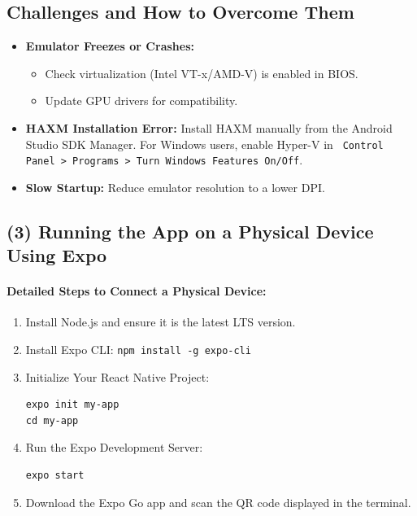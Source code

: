 \documentclass[12pt]{article}
\begin{document}
\subsection*{Challenges and How to Overcome Them}
\begin{itemize}
    \item \textbf{Emulator Freezes or Crashes:}
    \begin{itemize}
        \item Check virtualization (Intel VT-x/AMD-V) is enabled in BIOS.
        \item Update GPU drivers for compatibility.
    \end{itemize}
    \item \textbf{HAXM Installation Error:} Install HAXM manually from the Android Studio SDK Manager. For Windows users, enable Hyper-V in \texttt{ Control Panel > Programs > Turn Windows Features On/Off}.
    \item \textbf{Slow Startup:} Reduce emulator resolution to a lower DPI.
\end{itemize}

\subsection*{(3) Running the App on a Physical Device Using Expo}

\paragraph{Detailed Steps to Connect a Physical Device:}
\begin{enumerate}
    \item Install Node.js and ensure it is the latest LTS version.
    \item Install Expo CLI: \texttt{npm install -g expo-cli}
    \item Initialize Your React Native Project:
    \begin{verbatim}
expo init my-app
cd my-app
    \end{verbatim}
    \item Run the Expo Development Server:
    \begin{verbatim}
expo start
    \end{verbatim}
    \item Download the Expo Go app and scan the QR code displayed in the terminal.
\end{enumerate}
\end{document}
